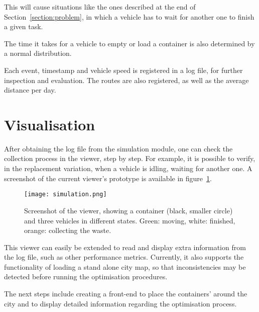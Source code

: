 This will cause situations like the ones described at the end of
Section~\ref{section:problem}, in which a vehicle has to wait for another one
to finish a given task.

The time it takes for a vehicle to empty or load a container is also
determined by a normal distribution.

Each event, timestamp and vehicle speed is registered in a log file, for
further inspection and evaluation. The routes are also registered, as well as
the average distance per day.






\section{Visualisation}
\label{section:visualisation}

After obtaining the log file from the simulation module, one can check the
collection process in the viewer, step by step. For example, it is possible
to verify, in the replacement variation, when a vehicle is idling, waiting
for another one. A screenshot of the current viewer's prototype is available
in figure~\ref{fig:simulation}.

\begin{figure}[h]
\centering
\texttt{[image: simulation.png]}
\caption{Screenshot of the viewer, showing a container (black, smaller circle)
and three vehicles in different states. Green: moving, white: finished, orange:
collecting the waste.}
\label{fig:simulation}
\end{figure}

This viewer can easily be extended to read and display extra information from
the log file, such as other performance metrics. Currently, it also supports
the functionality of loading a stand alone city map, so that inconsistencies
may be detected before running the optimisation procedures.

The next steps include creating a front-end to place the containers' around
the city and to display detailed information regarding the optimisation
process.


